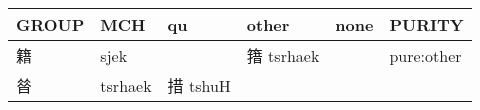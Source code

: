 \documentclass[14pt,a4paper]{scrartcl}
\begin{document}
\begin{longtable}[c]{@{}llllll@{}}
\toprule
\begin{minipage}[b]{0.14\columnwidth}\raggedright\strut
GROUP
\strut\end{minipage} &
\begin{minipage}[b]{0.14\columnwidth}\raggedright\strut
MCH
\strut\end{minipage} &
\begin{minipage}[b]{0.14\columnwidth}\raggedright\strut
qu
\strut\end{minipage} &
\begin{minipage}[b]{0.14\columnwidth}\raggedright\strut
other
\strut\end{minipage} &
\begin{minipage}[b]{0.14\columnwidth}\raggedright\strut
none
\strut\end{minipage} &
\begin{minipage}[b]{0.14\columnwidth}\raggedright\strut
PURITY
\strut\end{minipage}\tabularnewline
\midrule
\endhead
\begin{minipage}[t]{0.14\columnwidth}\raggedright\strut
籍
\strut\end{minipage} &
\begin{minipage}[t]{0.14\columnwidth}\raggedright\strut
sjek
\strut\end{minipage} &
\begin{minipage}[t]{0.14\columnwidth}\raggedright\strut
\strut\end{minipage} &
\begin{minipage}[t]{0.14\columnwidth}\raggedright\strut
簎 tsrhaek
\strut\end{minipage} &
\begin{minipage}[t]{0.14\columnwidth}\raggedright\strut
\strut\end{minipage} &
\begin{minipage}[t]{0.14\columnwidth}\raggedright\strut
pure:other
\strut\end{minipage}\tabularnewline
\begin{minipage}[t]{0.14\columnwidth}\raggedright\strut
㫺
\strut\end{minipage} &
\begin{minipage}[t]{0.14\columnwidth}\raggedright\strut
tsrhaek
\strut\end{minipage} &
\begin{minipage}[t]{0.14\columnwidth}\raggedright\strut
措 tshuH
\strut\end{minipage} &
\begin{minipage}[t]{0.14\columnwidth}\raggedright\strut

\end{minipage}
\end{longtable}
\end{document}
